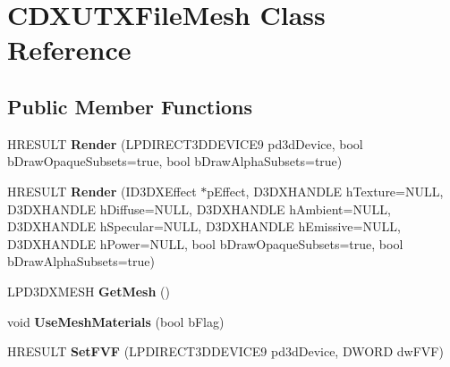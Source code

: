 \hypertarget{class_c_d_x_u_t_x_file_mesh}{\section{C\+D\+X\+U\+T\+X\+File\+Mesh Class Reference}
\label{class_c_d_x_u_t_x_file_mesh}
}
\subsection*{Public Member Functions}
\begin{DoxyCompactItemize}
\item 
\hypertarget{class_c_d_x_u_t_x_file_mesh_a8e666af33d8733cb287ba221ca5e0f89}{H\+R\+E\+S\+U\+L\+T {\bfseries Render} (L\+P\+D\+I\+R\+E\+C\+T3\+D\+D\+E\+V\+I\+C\+E9 pd3d\+Device, bool b\+Draw\+Opaque\+Subsets=true, bool b\+Draw\+Alpha\+Subsets=true)}\label{class_c_d_x_u_t_x_file_mesh_a8e666af33d8733cb287ba221ca5e0f89}

\item 
\hypertarget{class_c_d_x_u_t_x_file_mesh_a7f00f6d2858db817a522ba7f292bf6cd}{H\+R\+E\+S\+U\+L\+T {\bfseries Render} (I\+D3\+D\+X\+Effect $\ast$p\+Effect, D3\+D\+X\+H\+A\+N\+D\+L\+E h\+Texture=N\+U\+L\+L, D3\+D\+X\+H\+A\+N\+D\+L\+E h\+Diffuse=N\+U\+L\+L, D3\+D\+X\+H\+A\+N\+D\+L\+E h\+Ambient=N\+U\+L\+L, D3\+D\+X\+H\+A\+N\+D\+L\+E h\+Specular=N\+U\+L\+L, D3\+D\+X\+H\+A\+N\+D\+L\+E h\+Emissive=N\+U\+L\+L, D3\+D\+X\+H\+A\+N\+D\+L\+E h\+Power=N\+U\+L\+L, bool b\+Draw\+Opaque\+Subsets=true, bool b\+Draw\+Alpha\+Subsets=true)}\label{class_c_d_x_u_t_x_file_mesh_a7f00f6d2858db817a522ba7f292bf6cd}

\item 
\hypertarget{class_c_d_x_u_t_x_file_mesh_a6d3393a3b68518317099ccaeef8d415f}{L\+P\+D3\+D\+X\+M\+E\+S\+H {\bfseries Get\+Mesh} ()}\label{class_c_d_x_u_t_x_file_mesh_a6d3393a3b68518317099ccaeef8d415f}

\item 
\hypertarget{class_c_d_x_u_t_x_file_mesh_a711b94b056b885a6c8a8a387b2ad91d6}{void {\bfseries Use\+Mesh\+Materials} (bool b\+Flag)}\label{class_c_d_x_u_t_x_file_mesh_a711b94b056b885a6c8a8a387b2ad91d6}

\item 
\hypertarget{class_c_d_x_u_t_x_file_mesh_a2edc905addeb64575bc82e78d4b4a24a}{H\+R\+E\+S\+U\+L\+T {\bfseries Set\+F\+V\+F} (L\+P\+D\+I\+R\+E\+C\+T3\+D\+D\+E\+V\+I\+C\+E9 pd3d\+Device, D\+W\+O\+R\+D dw\+F\+V\+F)}\label{class_c_d_x_u_t_x_file_mesh_a2edc905addeb64575bc82e78d4b4a24a}


\end{DoxyCompactItemize}
